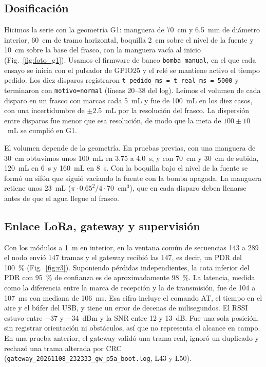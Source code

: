 \subsection{Dosificación}
\label{sec:res_dosif}

Hicimos la serie con la geometría G1: manguera de 70~cm y 6.5~mm de diámetro interior, 60~cm de tramo horizontal, boquilla 2~cm sobre el nivel de la fuente y 10~cm sobre la base del frasco, con la manguera vacía al inicio (Fig.~\ref{fig:foto_g1}). Usamos el firmware de banco \texttt{bomba\_manual}, en el que cada ensayo se inicia con el pulsador de GPIO25 y el relé se mantiene activo el tiempo pedido. Los diez disparos registraron \texttt{t\_pedido\_ms = t\_real\_ms = 5000} y terminaron con \texttt{motivo=normal} (líneas 20--38 del log). Leímos el volumen de cada disparo en un frasco con marcas cada 5~mL y fue de 100~mL en los diez casos, con una incertidumbre de $\pm 2.5$~mL por la resolución del frasco. La dispersión entre disparos fue menor que esa resolución, de modo que la meta de $100 \pm 10$~mL se cumplió en G1.

El volumen depende de la geometría. En pruebas previas, con una manguera de 30~cm obtuvimos unos 100~mL en 3.75 a 4.0~s, y con 70~cm y 30~cm de subida, 120~mL en 6~s y 160~mL en 8~s. Con la boquilla bajo el nivel de la fuente se formó un sifón que siguió vaciando la fuente con la bomba apagada. La manguera retiene unos 23~mL ($\pi \cdot 0.65^2/4 \cdot 70$~cm$^3$), que en cada disparo deben llenarse antes de que el agua llegue al frasco.

\subsection{Enlace LoRa, gateway y supervisión}
\label{sec:res_lora}

Con los módulos a 1~m en interior, en la ventana común de secuencias 143 a 289 el nodo envió 147 tramas y el gateway recibió las 147, es decir, un PDR del 100~\% (Fig.~\ref{fig:r3}). Suponiendo pérdidas independientes, la cota inferior del PDR con 95~\% de confianza es de aproximadamente 98~\%. La latencia, medida como la diferencia entre la marca de recepción y la de transmisión, fue de 104 a 107~ms con mediana de 106~ms. Esa cifra incluye el comando AT, el tiempo en el aire y el búfer del USB, y tiene un error de decenas de milisegundos. El RSSI estuvo entre $-37$ y $-34$~dBm y la SNR entre 12 y 13~dB. Fue una sola posición, sin registrar orientación ni obstáculos, así que no representa el alcance en campo. En una prueba anterior, el gateway validó una trama real, ignoró un duplicado y rechazó una trama alterada por CRC (\texttt{gateway\_20261108\_232333\_gw\_p5a\_boot.log}, L43 y L50).

